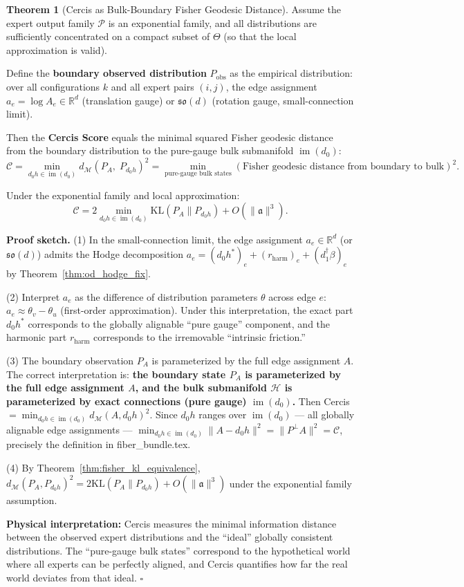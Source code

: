 \documentclass[12pt,a4paper]{article}
\theoremstyle{definition}
\newtheorem{theorem}{Theorem}[section]
\theoremstyle{remark}
\theoremstyle{definition}
\newcommand{\R}{\mathbb{R}}
\newcommand{\doneT}{d_1^\dagger}
\newcommand{\cercis}{\mathcal{C}}
\newcommand{\KL}{\mathrm{KL}}
\newcommand{\GeoDist}{d_{\mathcal{M}}}
\DeclareMathOperator{\im}{im}
\begin{document}
\begin{theorem}[Cercis as Bulk-Boundary Fisher Geodesic Distance]\label{thm:cercis_bulk_boundary}
Assume the expert output family $\mathcal{P}$ is an exponential family, and all distributions are sufficiently concentrated on a compact subset of $\Theta$ (so that the local approximation is valid).

Define the \textbf{boundary observed distribution} $P_{\text{obs}}$ as the empirical distribution: over all configurations $k$ and all expert pairs $(i,j)$,
the edge assignment $a_e = \log A_e \in \R^d$ (translation gauge) or $\mathfrak{so}(d)$ (rotation gauge, small-connection limit).

Then the \textbf{Cercis Score} equals the minimal squared Fisher geodesic distance from the boundary distribution to the pure-gauge bulk submanifold $\im(d_0)$:
\[
    \boxed{\cercis = \min_{d_0 h \in \im(d_0)} \GeoDist(P_A,\; P_{d_0 h})^2
    = \min_{\text{pure-gauge bulk states}} (\text{Fisher geodesic distance from boundary to bulk})^2.}
\]

Under the exponential family and local approximation:
\[
    \cercis = 2 \min_{d_0 h \in \im(d_0)} \KL(P_A \| P_{d_0 h}) + O(\|\mathfrak{a}\|^3).
\]

\textbf{Proof sketch.}
(1) In the small-connection limit, the edge assignment $a_e \in \R^d$ (or $\mathfrak{so}(d)$) admits the Hodge decomposition
$a_e = (d_0 h^*)_e + (r_{\text{harm}})_e + (\doneT \beta)_e$ by Theorem~\ref{thm:od_hodge_fix}.

(2) Interpret $a_e$ as the difference of distribution parameters $\theta$ across edge $e$: $a_e \approx \theta_v - \theta_u$ (first-order approximation).
Under this interpretation, the exact part $d_0 h^*$ corresponds to the globally alignable ``pure gauge'' component,
and the harmonic part $r_{\text{harm}}$ corresponds to the irremovable ``intrinsic friction.''

(3) The boundary observation $P_A$ is parameterized by the full edge assignment $A$.
The correct interpretation is: \textbf{the boundary state $P_A$ is parameterized by the full edge assignment $A$,
and the bulk submanifold $\mathcal{H}$ is parameterized by exact connections (pure gauge) $\im(d_0)$.}
Then Cercis $= \min_{d_0 h \in \im(d_0)} \GeoDist(A, d_0 h)^2$.
Since $d_0 h$ ranges over $\im(d_0)$ — all globally alignable edge assignments —
$\min_{d_0 h \in \im(d_0)} \|A - d_0 h\|^2 = \|P^\perp A\|^2 = \cercis$, precisely the definition in fiber\_bundle.tex.

(4) By Theorem~\ref{thm:fisher_kl_equivalence}, $\GeoDist(P_A, P_{d_0 h})^2 = 2\KL(P_A \| P_{d_0 h}) + O(\|\mathfrak{a}\|^3)$ under the exponential family assumption.

\textbf{Physical interpretation:} Cercis measures the minimal information distance between the observed expert distributions and the ``ideal'' globally consistent distributions.
The ``pure-gauge bulk states'' correspond to the hypothetical world where all experts can be perfectly aligned,
and Cercis quantifies how far the real world deviates from that ideal. $\square$
\end{theorem}
\end{document}
